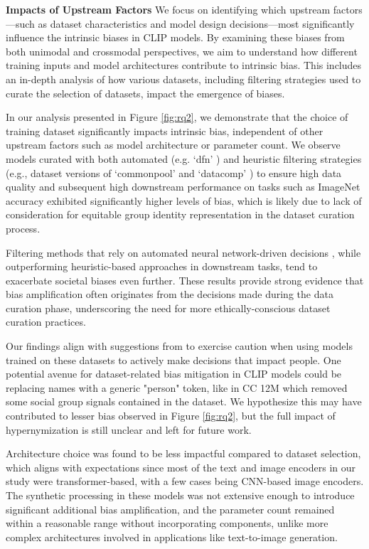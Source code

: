 \noindent \textbf{Impacts of Upstream Factors} We focus on identifying which upstream factors—such as dataset characteristics and model design decisions—most significantly influence the intrinsic biases in CLIP models. By examining these biases from both unimodal and crossmodal perspectives, we aim to understand how different training inputs and model architectures contribute to intrinsic bias. This includes an in-depth analysis of how various datasets, including filtering strategies used to curate the selection of datasets, impact the emergence of biases. 


In our analysis presented in Figure \ref{fig:rq2}, we demonstrate that the choice of training dataset significantly impacts intrinsic bias, independent of other upstream factors such as model architecture or parameter count. We observe models curated with both automated (e.g. `dfn' \cite{fang_data_2023}) and heuristic filtering strategies (e.g., dataset versions of `commonpool' and `datacomp' \cite{gadre2024datacomp}) to ensure high data quality and subsequent high downstream performance on tasks such as ImageNet accuracy exhibited significantly higher levels of bias, which is likely due to lack of consideration for equitable group identity representation in the dataset curation process. 

Filtering methods that rely on automated neural network-driven decisions \cite{fang_data_2023}, while outperforming heuristic-based approaches in downstream tasks, tend to exacerbate societal biases even further. These results provide strong evidence that bias amplification often originates from the decisions made during the data curation phase, underscoring the need for more ethically-conscious dataset curation practices. 

Our findings align with suggestions from \citet{gadre2024datacomp} to exercise caution when using models trained on these datasets to actively make decisions that impact people. One potential avenue for dataset-related bias mitigation in CLIP models could be replacing names with a generic "person" token, like in CC 12M \cite{Changpinyo2021ConceptualConcepts} which removed some social group signals contained in the dataset. We hypothesize this may have contributed to lesser bias observed in Figure \ref{fig:rq2}, but the full impact of hypernymization is still unclear and left for future work.

Architecture choice was found to be less impactful compared to dataset selection, which aligns with expectations since most of the text and image encoders in our study were transformer-based, with a few cases being CNN-based image encoders. The synthetic processing in these models was not extensive enough to introduce significant additional bias amplification, and the parameter count remained within a reasonable range without incorporating components, unlike more complex architectures involved in applications like text-to-image generation. 

